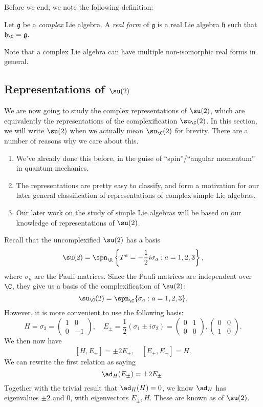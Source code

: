 \documentclass[a4paper]{article}
\begin{document}
Before we end, we note the following definition:
\begin{defi}
  Let $\mathfrak{g}$ be a \emph{complex} Lie algebra. A \emph{real form} of $\mathfrak{g}$ is a real Lie algebra $\mathfrak{h}$ such that $\mathfrak{h}_\C = \mathfrak{g}$.
\end{defi}
Note that a complex Lie algebra can have multiple non-isomorphic real forms in general.

\subsection{Representations of \texorpdfstring{$\su(2)$}{su(2)}}
We are now going to study the complex representations of $\su(2)$, which are equivalently the representations of the complexification $\su_\C(2)$. In this section, we will write $\su(2)$ when we actually mean $\su_\C(2)$ for brevity. There are a number of reasons why we care about this.
\begin{enumerate}
  \item We've already done this before, in the guise of ``spin''/``angular momentum'' in quantum mechanics.
  \item The representations are pretty easy to classify, and form a motivation for our later general classification of representations of complex simple Lie algebras.
  \item Our later work on the study of simple Lie algebras will be based on our knowledge of representations of $\su(2)$.
\end{enumerate}

Recall that the uncomplexified $\su(2)$ has a basis
\[
  \su(2) = \spn_\R\left\{T^a = -\frac{1}{2}i \sigma_a: a = 1, 2, 3\right\},
\]
where $\sigma_a$ are the Pauli matrices. Since the Pauli matrices are independent over $\C$, they give us a basis of the complexification of $\su(2)$:
\[
  \su_\C(2) = \spn_\C\{\sigma_a: a = 1, 2, 3\}.
\]
However, it is more convenient to use the following basis:
\[
  H = \sigma_3 =
  \begin{pmatrix}
    1 & 0\\
    0 & -1
  \end{pmatrix},\quad E_{\pm} = \frac{1}{2} (\sigma_1 \pm i \sigma_2) =
  \begin{pmatrix}
    0 & 1 \\
    0 & 0
  \end{pmatrix},
  \begin{pmatrix}
    0 & 0\\
    1 & 0
  \end{pmatrix}.
\]
We then now have
\[
  [H, E_{\pm}] = \pm 2 E_{\pm},\quad [E_+, E_-] = H.
\]
We can rewrite the first relation as saying
\[
  \ad_H(E_{\pm}) = \pm 2 E_{\pm}.
\]
Together with the trivial result that $\ad_H(H) = 0$, we know $\ad_H$ has eigenvalues $\pm 2$ and $0$, with eigenvectors $E_{\pm}, H$. These are known as  of $\su(2)$.
\end{document}
